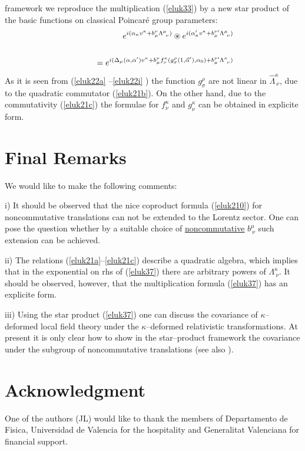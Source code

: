 \documentclass[a4paper,12pt]{article}
\begin{document}
framework we reproduce the multiplication (\ref{eluk33}) by a new
star product of the basic functions on classical Poincar\'{e}
group parameters:
\begin{eqnarray}\label{eluk37} 
&&  e^{ i( \alpha_{\kappa} v^{\kappa} +
  b^{\nu}_{\mu} \Lambda^{\mu}_{\ \nu})}
  \circledast
   e^{ i( \alpha^{\prime}_{\kappa} v^{\kappa} +
  b^{\nu \prime }_{\mu}  \Lambda^{\mu }_{\ \nu})}
\cr\cr  && \qquad  = e^{i(\Delta_{\mu}(\alpha, \alpha^{\prime})
v^{\kappa} + b^{\nu}_{\mu} f^{\kappa}_{\nu}
(g^{\rho}_{\sigma} (1, \vec{\alpha}^{\prime} ), \alpha_{0} )
+ b^{\nu \prime}_{\mu} \Lambda^{\kappa}_{\ \nu} )}
\end{eqnarray}
As it is seen from (\ref{eluk22a} --\ref{eluk22i} ) 
 the function                           
$g^{\rho}_{\sigma}$ are not linear in
$\widehat{\Lambda}^{\kappa}_{\ \nu}$, due to the quadratic 
commutator
(\ref{eluk21b}). On the other hand, due to   the commutativity
 (\ref{eluk21c}) the  formulae for $f^{\kappa}_{\nu}$ and
  $g^{\kappa}_{\nu}$ can be obtained in explicite form.

\section{Final Remarks}
                                      
We  would like to make the following comments:

i) It should be observed that the nice coproduct formula
 (\ref{eluk210}) for noncommutative translations can not be
 extended to the Lorentz sector. One can pose the question 
whether
 by a suitable choice of \underline{noncommutative}
 $b^{\mu}_{\ \nu}$ such extension can be achieved.

 ii) The relations (\ref{eluk21a}--\ref{eluk21c}) describe a
 quadratic algebra, which implies that in the exponential on rhs
  of (\ref{eluk37}) there are arbitrary powers of
  $\Lambda^{\kappa}_{\ \nu}$. It should be  observed, however, that
   the multiplication formula (\ref{eluk37}) has an explicite
   form.

   iii) Using the star  product (\ref{eluk37}) one can discuss the
   covariance of $\kappa$--deformed local field theory under the
   $\kappa$--deformed relativistic transformations. At present it
   is only clear how to show in the star--product framework the
   covariance under the subgroup of noncommutative translations
   (see also \cite{rluk14}).

\section*{Acknowledgment}
  One of the authors (JL) would like to thank the members of 
Departamento 
de Fisica, Universidad de Valencia for the hospitality and 
Generalitat 
Valenciana for financial support.
\end{document}
